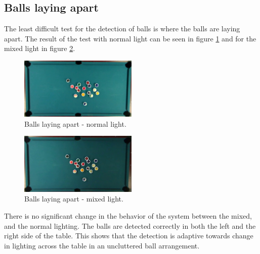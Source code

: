 \subsection{Balls laying apart}
The least difficult test for the detection of balls is where the balls are laying apart. The result of the test with normal light can be seen in figure \ref{fig:apartnormal} and for the mixed light in figure \ref{fig:apartmixed}.

\begin{figure}[htpb]
  \centering
\includegraphics[width=0.5\textwidth]{images/test/light1/laying-apart}
   \caption{Balls laying apart - normal light.}
  \label{fig:apartnormal}
\end{figure}

\begin{figure}[htpb]
  \centering
\includegraphics[width=0.5\textwidth]{images/test/mixed1/laying-apart}
   \caption{Balls laying apart - mixed light.}
  \label{fig:apartmixed}
\end{figure}

There is no significant change in the behavior of the system between the mixed, and the normal lighting. The balls are detected correctly in both the left and the right side of the table. This shows that the detection is adaptive towards change in lighting across the table in an uncluttered ball arrangement.

